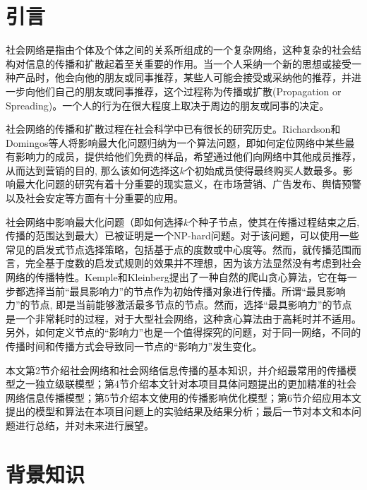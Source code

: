 \documentclass[UTF8]{ctexart}
\newcommand{\xiaosi}{\fontsize{12.1pt}{\baselineskip}\selectfont}
\newcommand{\upcite}[1]{\textsuperscript{\textsuperscript{\cite{#1}}}}
\begin{document}
	\clearpage
	
\begin{spacing}{1.2}
\xiaosi\tableofcontents\newpage
\end{spacing}


\xiaosi
\section{引言}

社会网络是指由个体及个体之间的关系所组成的一个复杂网络，这种复杂的社会结构对信息的传播和扩散起着至关重要的作用。当一个人采纳一个新的思想或接受一种产品时，他会向他的朋友或同事推荐，某些人可能会接受或采纳他的推荐，并进一步向他们自己的朋友或同事推荐，这个过程称为传播或扩散(Propagation or Spreading)。一个人的行为在很大程度上取决于周边的朋友或同事的决定。

社会网络的传播和扩散过程在社会科学中已有很长的研究历史。Richardson和Domingos等人\upcite{Richardson}将影响最大化问题归纳为一个算法问题，即如何定位网络中某些最有影响力的成员，提供给他们免费的样品，希望通过他们向网络中其他成员推荐，从而达到营销的目的, 那么该如何选择这$k$个初始成员使得最终购买人数最多。影响最大化问题的研究有着十分重要的现实意义，在市场营销、广告发布、舆情预警以及社会安定等方面有十分重要的应用。

社会网络中影响最大化问题（即如何选择$k$个种子节点，使其在传播过程结束之后, 传播的范围达到最大）已被证明是一个NP-hard问题\upcite{Kempe}。对于该问题，可以使用一些常见的启发式节点选择策略，包括基于点的度数或中心度等。然而，就传播范围而言，完全基于度数的启发式规则的效果并不理想，因为该方法显然没有考虑到社会网络的传播特性。Kemple和Kleinberg提出了一种自然的爬山贪心算法，它在每一步都选择当前“最具影响力”的节点作为初始传播对象进行传播。所谓“最具影响力”的节点, 即是当前能够激活最多节点的节点。然而，选择“最具影响力”的节点是一个非常耗时的过程，对于大型社会网络，这种贪心算法由于高耗时并不适用。另外，如何定义节点的“影响力”也是一个值得探究的问题，对于同一网络，不同的传播时间和传播方式会导致同一节点的“影响力”发生变化。

本文第2节介绍社会网络和社会网络信息传播的基本知识，并介绍最常用的传播模型之一\raisebox{0.5mm}{------}独立级联模型；第4节介绍本文针对本项目具体问题提出的更加精准的社会网络信息传播模型；第5节介绍本文使用的传播影响优化模型；第6节介绍应用本文提出的模型和算法在本项目问题上的实验结果及结果分析；最后一节对本文和本问题进行总结，并对未来进行展望。



\section{背景知识}
\end{document}
